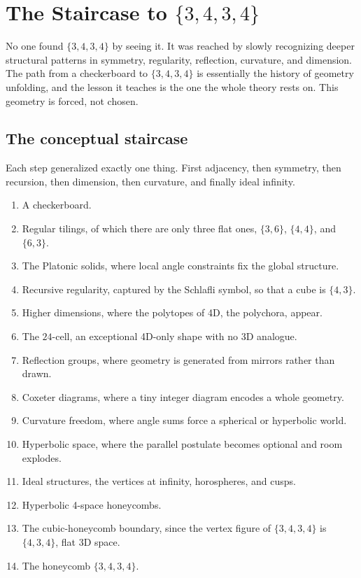 \section{The Staircase to \texorpdfstring{$\{3,4,3,4\}$}{3,4,3,4}}

No one found $\{3,4,3,4\}$ by seeing it. It was reached by slowly recognizing deeper structural patterns in symmetry, regularity, reflection, curvature, and dimension. The path from a checkerboard to $\{3,4,3,4\}$ is essentially the history of geometry unfolding, and the lesson it teaches is the one the whole theory rests on. This geometry is forced, not chosen.

\subsection{The conceptual staircase}

Each step generalized exactly one thing. First adjacency, then symmetry, then recursion, then dimension, then curvature, and finally ideal infinity.

\begin{enumerate}
  \item A checkerboard.
  \item Regular tilings, of which there are only three flat ones, $\{3,6\}$, $\{4,4\}$, and $\{6,3\}$.
  \item The Platonic solids, where local angle constraints fix the global structure.
  \item Recursive regularity, captured by the Schlafli symbol, so that a cube is $\{4,3\}$.
  \item Higher dimensions, where the polytopes of 4D, the polychora, appear.
  \item The $24$-cell, an exceptional 4D-only shape with no 3D analogue.
  \item Reflection groups, where geometry is generated from mirrors rather than drawn.
  \item Coxeter diagrams, where a tiny integer diagram encodes a whole geometry.
  \item Curvature freedom, where angle sums force a spherical or hyperbolic world.
  \item Hyperbolic space, where the parallel postulate becomes optional and room explodes.
  \item Ideal structures, the vertices at infinity, horospheres, and cusps.
  \item Hyperbolic 4-space honeycombs.
  \item The cubic-honeycomb boundary, since the vertex figure of $\{3,4,3,4\}$ is $\{4,3,4\}$, flat 3D space.
  \item The honeycomb $\{3,4,3,4\}$.
\end{enumerate}


